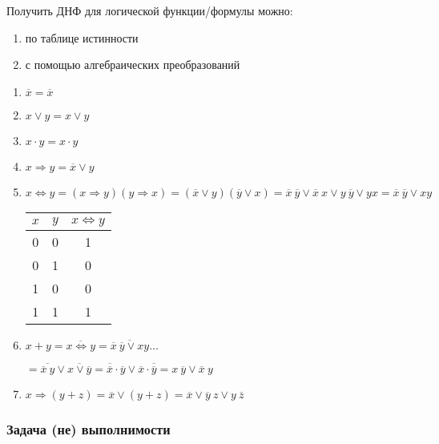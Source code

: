 \documentclass[russian]{lecture-notes}
\begin{document}
\begin{sloppypar}
Получить ДНФ для логической функции/формулы можно:
\begin{enumerate}
	\item по таблице истинности
	\item с помощью алгебраических преобразований
\end{enumerate}

\begin{example}
	\begin{enumerate}
		\item $\overline{x} = \overline{x}$
		\item $x \lor y = x \lor y$
		\item $x \cdot y = x \cdot y$
		\item $x \Rightarrow y = \overline{x} \lor y$
		\item $x \Leftrightarrow y = (x \Rightarrow y)(y \Rightarrow x) = (\overline{x} \lor y)(\overline{y} \lor x) = \overline{x} \: \overline{y} \lor \overline{x} \: x \lor y \: \overline{y} \lor yx = \overline{x} \: \overline{y} \lor xy $
		
		\begin{table}[h!]
			\centering
			\begin{tabular}{|c|c|c|}
				\hline
				$x$ & $y$ & $x \Leftrightarrow y$ \\ \hline
				0 & 0 & 1  \\ \hline
				0 & 1 & 0  \\ \hline
				1 & 0 & 0  \\ \hline
				1 & 1 & 1  \\ \hline
			\end{tabular}
		\end{table}
		
		\item{ $x + y = \overline{x \Leftrightarrow y} = \overline{\overline{x} \: \overline{y} \lor xy} \dots$
		
			$ = \overline{\overline{x} \: y} \lor \overline{x \lor \overline{y}} = \overline{\overline{x}} \cdot \overline{y} \lor \overline{x} \cdot \overline{\overline{y}} = x \: \overline{y} \lor \overline{x} \: y$
		}
		\item $x \Rightarrow (y + z) = \overline{x} \lor (y + z) = \overline{x} \lor \overline{y} \: z \lor y \: \overline{z}$
	\end{enumerate}
\end{example}

\subsubsection{Задача (не) выполнимости}


\end{sloppypar}
\end{document}
